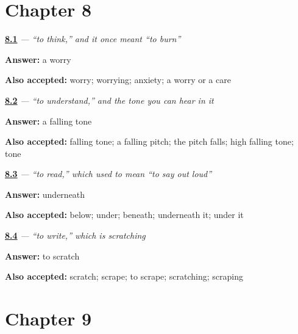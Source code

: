\section*{Chapter 8}

\noindent\begin{minipage}[t]{\linewidth}
\raggedright
\hyperlink{review-PA-C08-sochna-soch}{\textbf{8.1}} \emph{ — “to think,” and it once meant “to burn”}\par
\small \textbf{Answer:} a worry\par
\footnotesize \textbf{Also accepted:} worry; worrying; anxiety; a worry or a care
\end{minipage}\par\medskip

\noindent\begin{minipage}[t]{\linewidth}
\raggedright
\hyperlink{review-PA-C08-samajhna-tone}{\textbf{8.2}} \emph{ — “to understand,” and the tone you can hear in it}\par
\small \textbf{Answer:} a falling tone\par
\footnotesize \textbf{Also accepted:} falling tone; a falling pitch; the pitch falls; high falling tone; tone
\end{minipage}\par\medskip

\noindent\begin{minipage}[t]{\linewidth}
\raggedright
\hyperlink{review-PA-C08-parhna-subjoined}{\textbf{8.3}} \emph{ — “to read,” which used to mean “to say out loud”}\par
\small \textbf{Answer:} underneath\par
\footnotesize \textbf{Also accepted:} below; under; beneath; underneath it; under it
\end{minipage}\par\medskip

\noindent\begin{minipage}[t]{\linewidth}
\raggedright
\hyperlink{review-PA-C08-likhna-four-roots}{\textbf{8.4}} \emph{ — “to write,” which is scratching}\par
\small \textbf{Answer:} to scratch\par
\footnotesize \textbf{Also accepted:} scratch; scrape; to scrape; scratching; scraping
\end{minipage}\par\medskip

\section*{Chapter 9}

